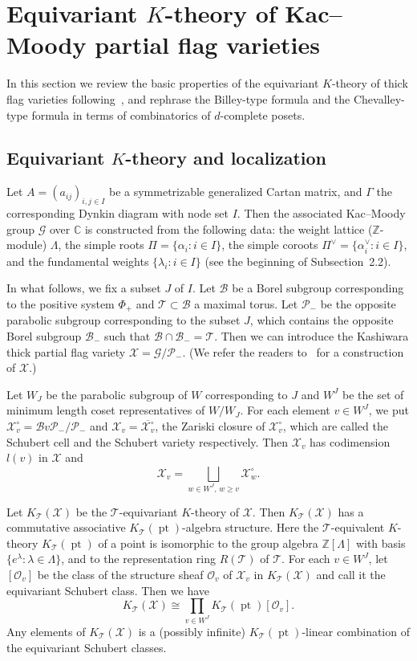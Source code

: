 \documentclass[ALCO,ThmDefs,Unicode,epreuves]{cedram}
\newcommand\Int{\mathbb{Z}}
\newcommand\Comp{\mathbb{C}}
\DeclareMathOperator{\point}{pt}
\newcommand\BB{\mathcal{B}}
\newcommand\GG{\mathcal{G}}
\newcommand\OO{\mathcal{O}}
\newcommand\PP{\mathcal{P}}
\newcommand\TT{\mathcal{T}}
\newcommand\XX{\mathcal{X}}
\begin{document}
\section{%
Equivariant \texorpdfstring{$K$}{K}-theory of Kac--Moody partial flag varieties
}\label{sect4}

In this section we review the basic properties of the equivariant $K$-theory 
of thick flag varieties following~\cite[Section~3]{LSS}, 
and rephrase the Billey-type formula and the Chevalley-type formula 
in terms of combinatorics of $d$-complete posets.

\subsection{Equivariant \texorpdfstring{$K$}{K}-theory and localization}\label{subsec4.1}

Let $A = (a_{ij})_{i,j \in I}$ be a symmetrizable generalized Cartan matrix, 
and $\Gamma$ the corresponding Dynkin diagram with node set $I$.
Then the associated Kac--Moody group $\mathcal{G}$ over $\Comp$ is constructed from the following data:
the weight lattice ($\Int$-module) $\Lambda$, the simple roots $\Pi = \{ \alpha_i : i \in I \}$, 
the simple coroots $\Pi^\vee = \{ \alpha^\vee_i :i \in I \}$, 
and the fundamental weights $\{ \lambda_i : i \in I \}$ (see the beginning of Subsection~2.2).

In what follows, we fix a subset $J$ of $I$.
Let $\BB$ be a Borel subgroup corresponding to the positive system $\Phi_+$ 
and $\TT \subset \BB$ a maximal torus.
Let $\PP_-$ be the opposite parabolic subgroup corresponding to the subset $J$, 
which contains the opposite Borel subgroup $\BB_-$ such that $\BB \cap \BB_- = \TT$.
Then we can introduce the Kashiwara thick partial flag variety $\XX = \GG/\PP_-$.
(We refer the readers to~\cite{Ka} for a construction of $\XX$.)

Let $W_J$ be the parabolic subgroup of $W$ corresponding to $J$ 
and $W^J$ be the set of minimum length coset representatives of $W/W_J$.
For each element $v \in W^J$, we put $\XX^\circ_v = \BB v \PP_-/\PP_-$ 
and $\XX_v = \overline{\XX^\circ_v}$, the Zariski closure of $\XX^\circ_v$, 
which are called the Schubert cell and the Schubert variety respectively.
Then $\XX_v$ has codimension $l(v)$ in $\XX$ and
$$
\XX_v = \bigsqcup_{w \in W^J, \, w \ge v} \XX^\circ_w.
$$

Let $K_\TT(\XX)$ be the $\TT$-equivariant $K$-theory of $\XX$.
Then $K_\TT(\XX)$ has a commutative associative $K_\TT(\point)$-algebra structure.
Here the $\TT$-equivalent $K$-theory $K_\TT(\point)$ of a point is isomorphic 
to the group algebra $\Int[\Lambda]$ with basis $\{ e^\lambda : \lambda \in \Lambda \}$, 
and to the representation ring $R(\TT)$ of $\TT$.
For each $v \in W^J$, let $[\OO_v]$ be the class of the structure sheaf $\OO_v$ of $\XX_v$ 
in $K_\TT(\XX)$ and call it the equivariant Schubert class.
Then we have
$$
K_\TT(\XX) \cong \prod_{v \in W^J} K_\TT(\point) [\OO_v].
$$
Any elements of $K_\TT(\XX)$ is a (possibly infinite) $K_\TT(\point)$-linear combination 
of the equivariant Schubert classes.
\end{document}
